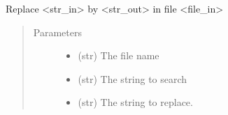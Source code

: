 \documentclass[a4paper,10pt,english]{sphinxmanual}
\begin{document}
\begin{fulllineitems}
\label{\detokenize{apidoc_src/src:src.utilsSat.replace_in_file}}
Replace \textless{}str\_in\textgreater{} by \textless{}str\_out\textgreater{} in file \textless{}file\_in\textgreater{}
\begin{quote}\begin{description}
\item[{Parameters}] \leavevmode\begin{itemize}
\item {} 
 \textendash{} (str) The file name

\item {} 
 \textendash{} (str) The string to search

\item {} 
 \textendash{} (str) The string to replace.

\end{itemize}

\end{description}\end{quote}

\end{fulllineitems}


\begin{fulllineitems}
\label{\detokenize{apidoc_src/src:src.utilsSat.reset}}
\end{fulllineitems}

\end{document}
